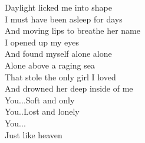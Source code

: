 Daylight licked me into shape\\
I must have been asleep for days\\
And moving lips to breathe her name\\
I opened up my eyes\\
And found myself alone alone\\
Alone above a raging sea\\
That stole the only girl I loved\\
And drowned her deep inside of me\\
You...Soft and only\\
You..Lost and lonely\\
You...\\
Just like heaven\\
